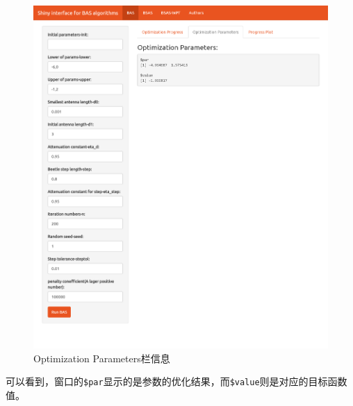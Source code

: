 \documentclass[]{ctexbook}
\begin{document}
\begin{figure}

{\centering \includegraphics[width=0.95\linewidth]{img/app3} 

}

\caption{Optimization Parameters栏信息}\label{fig:basparms}
\end{figure}

可以看到，窗口的\texttt{\$par}显示的是参数的优化结果，而\texttt{\$value}则是对应的目标函数值。
\end{document}
